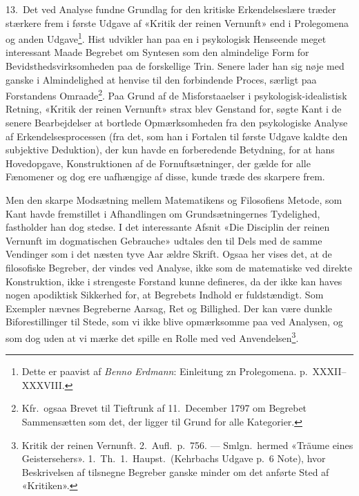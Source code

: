 \documentclass[12pt,a4paper]{article}
\newcommand{\apage}[1]{\marginnote{\footnotesize\textit{[#1]}}}
\begin{document}
13.\ Det ved Analyse fundne Grundlag for den kritiske Erkendelseslære
træder stærkere frem i første Udgave af «Kritik der reinen Vernunft» end i
Prolegomena og anden Udgave\footnote{Dette er paavist af \emph{Benno Erdmann}:
Einleitung zn Prolegomena. p.\ XXXII--XXXVIII.}. Hist udvikler
han paa en i psykologisk Henseende meget interessant Maade Begrebet om
Syntesen som den almindelige Form for Bevidsthedsvirksomheden paa de
forskellige Trin. Senere lader han sig nøje med ganske i Almindelighed at
henvise til den forbindende Proces, særligt paa Forstandens
Omraade\footnote{Kfr.\ ogsaa Brevet til Tieftrunk af 11.\ December 1797 om
Begrebet Sammensætten som det, der ligger til Grund for alle
Kategorier.}. Paa Grund af de Misforstaaelser i psykologisk-idealistisk
Retning, «Kritik der reinen Vernunft» strax blev Genstand for, søgte Kant
i de senere Bearbejdelser at bortlede Opmærksomheden fra den psykologiske
Analyse af Erkendelsesprocessen (fra det, som han i Fortalen til første
Udgave kaldte den subjektive Deduktion), der kun havde en forberedende
Betydning, for at hans Hovedopgave, Konstruktionen af de Fornuftsætninger,
der gælde for alle Fænomener og dog ere uafhængige af disse, kunde træde
des skarpere frem.

Men den skarpe Modsætning mellem Matematikens og Filosofiens Metode, som
\apage{29} Kant havde fremstillet i Afhandlingen om Grundsætningernes Tydelighed,
fastholder han dog stedse. I det interessante Afsnit «Die Disciplin der
reinen Vernunft im dogmatischen Gebrauche» udtales den til Dels med de
samme Vendinger som i det næsten tyve Aar ældre Skrift. Ogsaa her vises
det, at de filosofiske Begreber, der vindes ved Analyse, ikke som de
matematiske ved direkte Konstruktion, ikke i strengeste Forstand kunne
defineres, da der ikke kan haves nogen apodiktisk Sikkerhed for, at
Begrebets Indhold er fuldstændigt. Som Exempler nævnes Begreberne Aarsag,
Ret og Billighed. Der kan være dunkle Biforestillinger til Stede, som vi
ikke blive opmærksomme paa ved Analysen, og som dog uden at vi mærke det
spille en Rolle med ved Anvendelsen\footnote{Kritik der reinen
Vernunft. 2.\ Aufl.\ p.\ 756. --- Smlgn.\ hermed «Träume eines
Geistersehers». 1.\ Th.\ 1.\ Haupst.\ (Kehrbachs Udgave p.\ 6 Note),
hvor Beskrivelsen af tilsnegne Begreber ganske minder om det anførte Sted
af «Kritiken».}.
\end{document}
